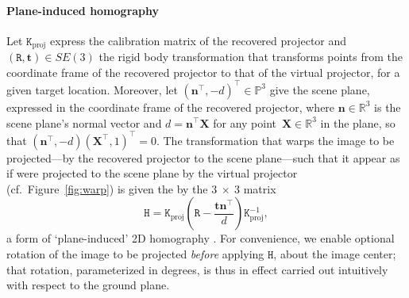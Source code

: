 \documentclass[review]{elsarticle}
\begin{document}
\paragraph{Plane-induced homography} Let $\mathtt{K}_\text{proj}$ express the calibration matrix of the recovered projector and $(\mathtt{R}, \mathbf{t}) \in SE(3)$ the rigid body transformation that transforms points from the coordinate frame of the recovered projector to that of the virtual projector, for a given target location. Moreover, let $(\mathbf{n}^\top, -d)^\top \in \mathbb{P}^3$ give the scene plane, expressed in the coordinate frame of the recovered projector, where $\mathbf{n} \in \mathbb{R}^3$ is the scene plane's normal vector and $d = \mathbf{n}^\top\mathbf{X}$ for any point~$\mathbf{X} \in \mathbb{R}^3$ in the plane, so that $(\mathbf{n}^\top, -d) (\mathbf{X}^\top, 1)^\top = 0$. The transformation that warps the image to be projected---by the recovered projector to the scene plane---such that it appear as if were projected to the scene plane by the virtual projector (cf.\ Figure~\ref{fig:warp}) is given the by the $3~\times~3$ matrix
\begin{equation}
\mathtt{H} = \mathtt{K}_\text{proj}\left(\mathtt{R} - \frac{\mathbf{t}\mathbf{n}^\top}{d}\right)\mathtt{K}_\text{proj}^{-1},
\label{homgen}
\end{equation}
a form of `plane-induced' 2D homography \cite{Hartley2004}. For convenience, we enable optional rotation of the image to be projected \textit{before} applying $\mathtt{H}$, about the image center; that rotation, parameterized in degrees, is thus in effect carried out intuitively with respect to the ground plane.
\end{document}
